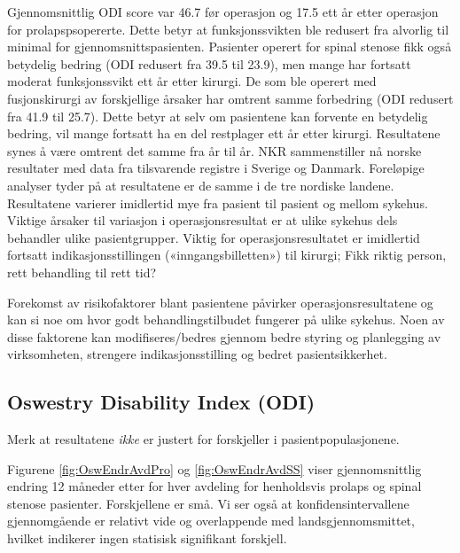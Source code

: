Gjennomsnittlig ODI score var 46.7 før operasjon og 17.5 ett år etter
operasjon for prolapspsopererte. Dette betyr at funksjonssvikten ble redusert fra alvorlig til minimal for gjennomsnittspasienten. Pasienter operert for spinal stenose fikk også betydelig bedring (ODI redusert fra 39.5 til 23.9), men mange har 
fortsatt moderat funksjonssvikt ett år etter kirurgi. 
De som ble operert med fusjonskirurgi av forskjellige årsaker har
omtrent samme forbedring (ODI redusert fra 41.9 til 25.7). 
Dette betyr at selv om
pasientene kan forvente en betydelig bedring, vil mange fortsatt ha en del restplager
ett år etter kirurgi. Resultatene synes å være omtrent det samme fra år til år. NKR
sammenstiller nå norske resultater med data fra tilsvarende registre i Sverige og
Danmark. Foreløpige analyser tyder på at resultatene er de samme i
de tre nordiske landene.
Resultatene varierer imidlertid mye fra pasient til pasient og mellom sykehus.
Viktige årsaker til variasjon i operasjonsresultat er at ulike sykehus dels behandler
ulike pasientgrupper. Viktig for operasjonsresultatet er imidlertid fortsatt
indikasjonsstillingen («inngangsbilletten») til kirurgi; Fikk riktig person, rett
behandling til rett tid?

Forekomst av risikofaktorer blant pasientene påvirker operasjonsresultatene og kan
si noe om hvor godt behandlingstilbudet fungerer på ulike sykehus. Noen av disse
faktorene kan modifiseres/bedres gjennom bedre styring og planlegging av
virksomheten, strengere indikasjonsstilling og bedret pasientsikkerhet.





\subsection{Oswestry Disability Index (ODI)}

Merk at resultatene \textit{ikke} er justert for forskjeller i pasientpopulasjonene. 




Figurene \ref{fig:OswEndrAvdPro} og \ref{fig:OswEndrAvdSS} viser gjennomsnittlig endring 12 måneder etter for hver avdeling for henholdsvis prolaps og spinal stenose pasienter. Forskjellene er små. Vi ser også at konfidensintervallene gjennomgående er relativt vide og overlappende med landsgjennomsmittet, hvilket indikerer ingen statisisk signifikant forskjell.

